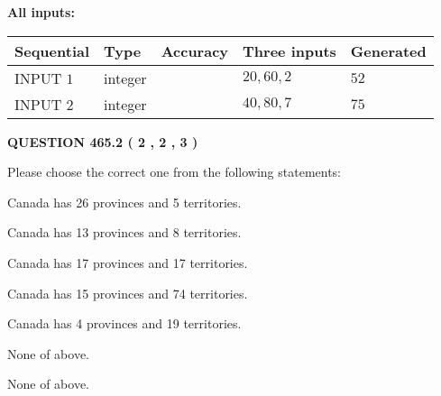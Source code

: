 \documentclass[12pt]{article}
\begin{document}
   
   
   
\noindent{}
   
   
   
   
\noindent\vspace{0.1in}\hspace{-0.08in} {\textbf{\Large{All inputs: }}}
   
   
  
  
\noindent\begin{tabular}{|l|l|l|l|l|}
\hline
 Sequential & Type & Accuracy & Three inputs & Generated \\ 
\hline
 
 
  INPUT $  1 $ & integer &  & $
 20
 , 
 60
 , 
 2
 $ & $ 52 $ 
 \\  \hline  
 
 
  INPUT $  2 $ & integer &  & $
 40
 , 
 80
 , 
 7
 $ & $ 75 $ 
 \\  \hline  
 \end{tabular}
   
   
  
\vspace{0.2in}
  
{\textbf{\Large{QUESTION
465.2 
 ( 2 , 2 , 3 )
}}}
  
  
Please choose the correct one from the following statements:
 
 
Canada has  26 provinces and  5 territories.
 
 
Canada has  13 provinces and  8 territories.
 
 
Canada has  17 provinces and  17 territories.
 
 
Canada has  15 provinces and  74 territories.
 
 
Canada has   4 provinces and  19 territories.
 
 
 None of above.
 
 
\noindent{}
 
 
 None of above.
 
 
\noindent{}
 
 
   
   
   
\end{document}

